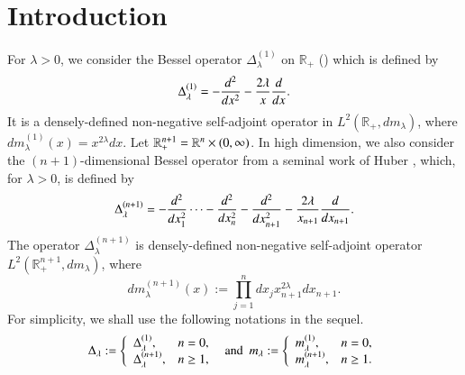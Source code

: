 \documentclass[12pt]{amsart}
\begin{document}
  \date{\today}





\begin{abstract}

\end{abstract}

\maketitle


\tableofcontents\newpage
\section{Introduction}
For $\lambda> 0$, we consider the Bessel operator $\Delta_\lambda^{(1)}$ on $\mathbb R_+$ (\cite{MS}) which is defined by
\begin{align*}
\Delta_{\lambda}^{(1)} = -{d^2\over dx^2} -{2\lambda\over x} {d\over dx}.
\end{align*}
It is a densely-defined non-negative self-adjoint operator in $L^2(\mathbb R_+, dm_\lambda)$, where $d m_\lambda^{(1)}(x)=x^{2\lambda}dx$. Let $\mathbb{R}^{n+1}_+=\mathbb{R}^n\times (0,\infty)$. In high dimension, we also consider the $(n+1)$-dimensional Bessel operator from a seminal work of Huber \cite{MR64284}, which, for $\lambda> 0$, is defined by
\begin{align}\label{Dlambda}
\Delta_\lambda^{(n+1)} = -{d^2\over dx_1^2}\cdots-{d^2\over dx_n^2} -{d^2\over dx_{n+1}^2} -{2\lambda\over x_{n+1}} {d\over dx_{n+1}}.
\end{align}
The operator $\Delta_\lambda^{(n+1)}$ is densely-defined non-negative self-adjoint operator $ L^2(\mathbb{R}_+^{n+1}, dm_\lambda)$,
where
$$dm_\lambda^{(n+1)}(x):=\prod_{j=1}^n dx_j x_{n+1}^{2\lambda}dx_{n+1}.$$
For simplicity, we shall use the following notations in the sequel.
$$\Delta_\lambda:=\left\{\begin{array}{ll}\Delta_\lambda^{(1)}, &n=0,\\ \Delta_\lambda^{(n+1)}, &n\geq 1,\end{array}\right.\ \ {\rm and}\ \ m_\lambda:=\left\{\begin{array}{ll}m_\lambda^{(1)}, &n=0,\\ m_\lambda^{(n+1)}, &n\geq 1.\end{array}\right.$$
%
\end{document}
